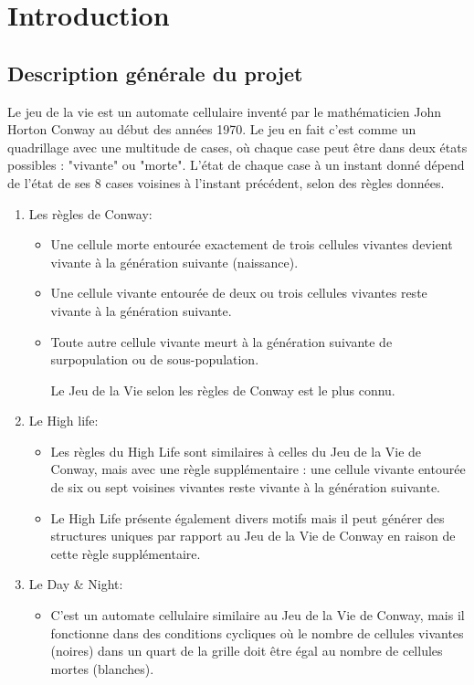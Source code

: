 \section{Introduction}



\subsection{Description générale du projet}
	Le jeu de la vie est un automate cellulaire inventé par le mathématicien John Horton Conway au début des années 1970. Le jeu en fait c'est comme un quadrillage avec une multitude de cases, où chaque case peut être dans deux états possibles : "vivante"  ou "morte". L'état de chaque case à un instant donné dépend de l'état de ses 8 cases voisines à l'instant précédent, selon des règles données.
\begin{enumerate}
	\item Les règles de Conway: 
 
        \begin{itemize}
            \item Une cellule morte entourée exactement de trois cellules vivantes devient vivante à la génération suivante (naissance).
            \item  Une cellule vivante entourée de deux ou trois cellules vivantes reste vivante à la génération suivante.
            \item Toute autre cellule vivante meurt à la génération suivante de surpopulation ou de sous-population.

        Le Jeu de la Vie selon les règles de Conway est le plus connu.
        \end{itemize}
	\item Le High life:
            \begin{itemize}
                \item Les règles du High Life sont similaires à celles du Jeu de la Vie de Conway, mais avec une règle supplémentaire : une cellule vivante entourée de six ou sept voisines vivantes reste vivante à la génération suivante.
                 \item Le High Life présente également divers motifs mais il peut générer des structures uniques par rapport au Jeu de la Vie de Conway en raison de cette règle supplémentaire.
            \end{itemize}
	\item Le Day \& Night:
            \begin{itemize}
                \item C'est un automate cellulaire similaire au Jeu de la Vie de Conway, mais il fonctionne dans des conditions cycliques où le nombre de cellules vivantes (noires) dans un quart de la grille doit être égal au nombre de cellules mortes (blanches).
                
            \end{itemize}
 
\end{enumerate}

